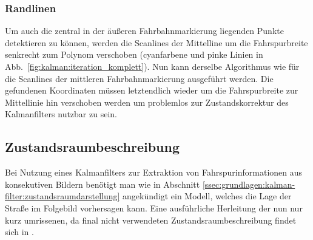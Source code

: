 \subsubsection{Randlinen}
Um auch die zentral in der äußeren Fahrbahnmarkierung liegenden Punkte detektieren zu können, werden die Scanlines der Mittelline um die Fahrspurbreite senkrecht zum Polynom verschoben (cyanfarbene und pinke Linien in Abb.~\ref{fig:kalman:iteration_komplett}). Nun kann derselbe Algorithmus wie für die Scanlines der mittleren Fahrbahnmarkierung ausgeführt werden. Die gefundenen Koordinaten müssen letztendlich wieder um die Fahrspurbreite zur Mittellinie hin verschoben werden um problemlos zur Zustandskorrektur des Kalmanfilters nutzbar zu sein.
 
\subsection{Zustandsraumbeschreibung}
Bei Nutzung eines Kalmanfilters zur Extraktion von Fahrspurinformationen aus konsekutiven Bildern benötigt man wie in Abschnitt \ref{ssec:grundlagen:kalman-filter:zustandsraumdarstellung} angekündigt ein Modell, welches die Lage der Straße im Folgebild vorhersagen kann. Eine ausführliche Herleitung der nun nur kurz umrissenen, da final nicht verwendeten Zustandsraumbeschreibung findet sich in \autocite[47-50]{petersfalkoFPGAbasierteBildverarbeitungspipelineZur2009}.


